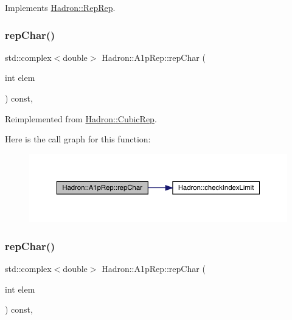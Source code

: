 Implements \mbox{\hyperlink{structHadron_1_1RepRep_ab3213025f6de249f7095892109575fde}{Hadron\+::\+Rep\+Rep}}.

\mbox{\label{structHadron_1_1A1pRep_a9f59a2c62dd82462ab66f5a990939898}} 
\subsubsection{\texorpdfstring{repChar()}{repChar()}\hspace{0.1cm}{\footnotesize\ttfamily [1/3]}}
{\footnotesize\ttfamily std\+::complex$<$double$>$ Hadron\+::\+A1p\+Rep\+::rep\+Char (\begin{DoxyParamCaption}\item[{int}]{elem }\end{DoxyParamCaption}) const\hspace{0.3cm}{\ttfamily [inline]}, {\ttfamily [virtual]}}



Reimplemented from \mbox{\hyperlink{structHadron_1_1CubicRep_af45227106e8e715e84b0af69cd3b36f8}{Hadron\+::\+Cubic\+Rep}}.

Here is the call graph for this function\+:
\nopagebreak
\begin{figure}[H]
\begin{center}
\leavevmode
\includegraphics[width=350pt]{da/dc7/structHadron_1_1A1pRep_a9f59a2c62dd82462ab66f5a990939898_cgraph}
\end{center}
\end{figure}
\mbox{\label{structHadron_1_1A1pRep_a9f59a2c62dd82462ab66f5a990939898}} 
\subsubsection{\texorpdfstring{repChar()}{repChar()}\hspace{0.1cm}{\footnotesize\ttfamily [2/3]}}
{\footnotesize\ttfamily std\+::complex$<$double$>$ Hadron\+::\+A1p\+Rep\+::rep\+Char (\begin{DoxyParamCaption}\item[{int}]{elem }\end{DoxyParamCaption}) const\hspace{0.3cm}{\ttfamily [inline]}, {\ttfamily [virtual]}}



